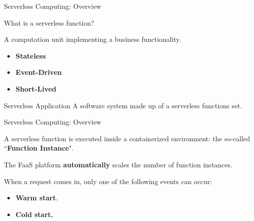\documentclass[13.5pt]{beamer}
\newcommand{\B}[1]{\textcolor{TorVergataColor}{\textbf{#1}}}
\begin{document}
\begin{frame}{Serverless Computing: Overview}
	
	\begin{block}{}
		\centering
		What is a serverless function?
	\end{block}
	\vspace{\baselineskip}
	A computation unit implementing a business functionality.
	
	\begin{itemize}
		\item \B{Stateless}
		\item \B{Event-Driven}
		\item \B{Short-Lived}
	\end{itemize}

	\vspace{\baselineskip}
	
	\begin{block}{Serverless Application}
		\justifying
		A software system made up of a serverless functions set.
	\end{block}

\end{frame} 
\begin{frame}{Serverless Computing: Overview}
	
	\begin{block}{}
		\centering
		A serverless function is executed inside a containerized environment: the so-called ``\B{Function Instance}".
	\end{block}
	\vspace{\baselineskip}
	
	\begin{block}{}
		\centering
		The FaaS platform \B{automatically} scales the number of function instances.
	\end{block}
	
	\vspace{\baselineskip}
	When a request comes in, only one of the following events can occur:
	\begin{itemize}
		\item \textbf{Warm start}.
		\item \textbf{Cold start.}
	\end{itemize}
	
	
\end{frame} 
\end{document}
